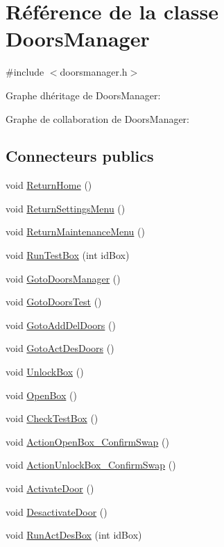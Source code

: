\hypertarget{class_doors_manager}{}\section{Référence de la classe Doors\+Manager}
\label{class_doors_manager}


{\ttfamily \#include $<$doorsmanager.\+h$>$}



Graphe d\textquotesingle{}héritage de Doors\+Manager\+:


Graphe de collaboration de Doors\+Manager\+:
\subsection*{Connecteurs publics}
\begin{DoxyCompactItemize}
\item 
void \hyperlink{class_doors_manager_ab9753c7b5c389f066f9988285859acbc}{Return\+Home} ()
\item 
void \hyperlink{class_doors_manager_af5221ef14eae2c7b5b444c15b0387702}{Return\+Settings\+Menu} ()
\item 
void \hyperlink{class_doors_manager_a6c3c18c3cc453bd382185778bce0e06b}{Return\+Maintenance\+Menu} ()
\item 
void \hyperlink{class_doors_manager_a169114f12c7b76f29146b9ec4bd5d9b3}{Run\+Test\+Box} (int id\+Box)
\item 
void \hyperlink{class_doors_manager_a2a9d76ab046158c1f97b5cb012ad95ec}{Goto\+Doors\+Manager} ()
\item 
void \hyperlink{class_doors_manager_a791c9c3a52e58e88fdf8ab16891dc4ca}{Goto\+Doors\+Test} ()
\item 
void \hyperlink{class_doors_manager_aaee08e6ab3f13ccc0fb1baffae659517}{Goto\+Add\+Del\+Doors} ()
\item 
void \hyperlink{class_doors_manager_af7d5e03a7e1a0d3da687bfcba912a0f2}{Goto\+Act\+Des\+Doors} ()
\item 
void \hyperlink{class_doors_manager_afb3ba894a6b58c8b45abc01d8d7881b5}{Unlock\+Box} ()
\item 
void \hyperlink{class_doors_manager_ad4f148e63553881e1c8ee240db59d3e5}{Open\+Box} ()
\item 
void \hyperlink{class_doors_manager_ad9e5dbe742190996a002d3b9390f6174}{Check\+Test\+Box} ()
\item 
void \hyperlink{class_doors_manager_a1c9701fdf3f963a6b06340f453ae9e8e}{Action\+Open\+Box\+\_\+\+Confirm\+Swap} ()
\item 
void \hyperlink{class_doors_manager_a512be29226d43b78098981ef60004485}{Action\+Unlock\+Box\+\_\+\+Confirm\+Swap} ()
\item 
void \hyperlink{class_doors_manager_adf818013f5e3ba23027c10549e09ffaa}{Activate\+Door} ()
\item 
void \hyperlink{class_doors_manager_a7be09e60a4625c76f376ee13f0d4e213}{Desactivate\+Door} ()
\item 
void \hyperlink{class_doors_manager_a34966cceb9b281f2f72dfb0cb971c17c}{Run\+Act\+Des\+Box} (int id\+Box)
\end{DoxyCompactItemize}
